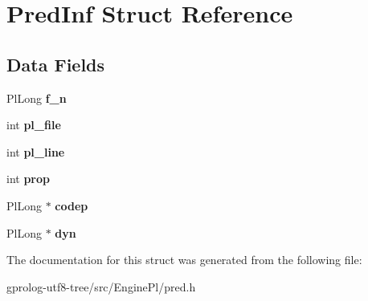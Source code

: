 \hypertarget{structPredInf}{}\section{Pred\+Inf Struct Reference}
\label{structPredInf}
\subsection*{Data Fields}
\begin{DoxyCompactItemize}
\item 
Pl\+Long {\bfseries f\+\_\+n}\hypertarget{structPredInf_ac0b2b557f702cda0d5111bc65630d5a3}{}\label{structPredInf_ac0b2b557f702cda0d5111bc65630d5a3}

\item 
int {\bfseries pl\+\_\+file}\hypertarget{structPredInf_a0d5ac69f7fce6062b3327fc2badc1658}{}\label{structPredInf_a0d5ac69f7fce6062b3327fc2badc1658}

\item 
int {\bfseries pl\+\_\+line}\hypertarget{structPredInf_a206ac901da36832f6111a542a2b8b11b}{}\label{structPredInf_a206ac901da36832f6111a542a2b8b11b}

\item 
int {\bfseries prop}\hypertarget{structPredInf_a2f0d287390fe634467a62f42f816d855}{}\label{structPredInf_a2f0d287390fe634467a62f42f816d855}

\item 
Pl\+Long $\ast$ {\bfseries codep}\hypertarget{structPredInf_a670788fe731440a8d7224e2729836dac}{}\label{structPredInf_a670788fe731440a8d7224e2729836dac}

\item 
Pl\+Long $\ast$ {\bfseries dyn}\hypertarget{structPredInf_aad15bc35f98eabb92f4ac4b9a35f65c0}{}\label{structPredInf_aad15bc35f98eabb92f4ac4b9a35f65c0}

\end{DoxyCompactItemize}


The documentation for this struct was generated from the following file\+:\begin{DoxyCompactItemize}
\item 
gprolog-\/utf8-\/tree/src/\+Engine\+Pl/pred.\+h\end{DoxyCompactItemize}
